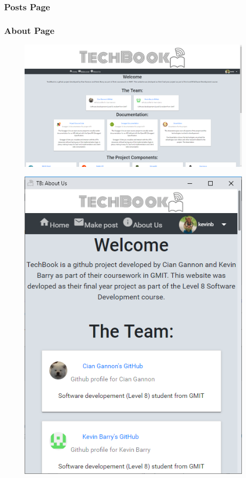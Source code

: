 \subsubsection{Posts Page}
\subsubsection{About Page}
\begin{figure}[H]
\centering
\begin{minipage}{.75\textwidth}
  \centering
  \includegraphics[width=.9\linewidth]{img/ui/about_PC.PNG}
  \label{fig:aboutPC}
\end{minipage}%
\begin{minipage}{.25\textwidth}
  \centering
  \includegraphics[width=.9\linewidth]{img/ui/about_MOBILE.PNG}
  \label{fig:aboutMobile}
\end{minipage}
\end{figure}
